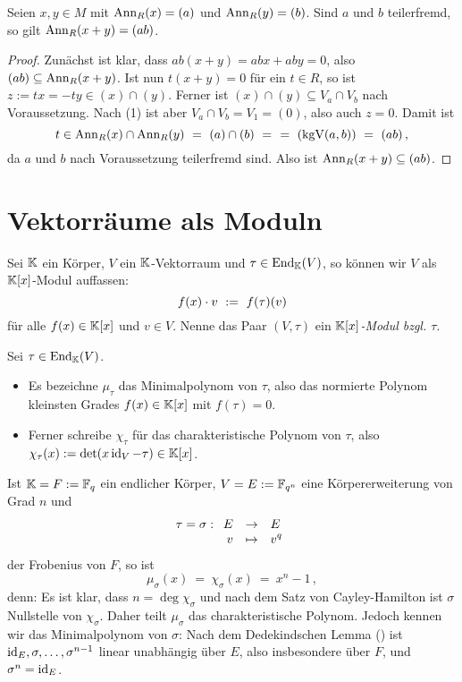 \begin{lemma}
  \label{lemma:annihilator_teilerfremd}
  Seien $x,y \in M$ mit $\operatorname{Ann}_R(x) = (a)$ und $\operatorname{Ann}_R(y) = (b)$. Sind 
  $a$ und $b$ teilerfremd, so gilt $\operatorname{Ann}_R(x+y) = (ab)$.
\end{lemma}
\begin{proof}
  Zunächst ist klar, dass $ab(x+y) = abx + aby = 0$, also 
  $(ab) \subseteq \operatorname{Ann}_R(x+y)$. Ist nun $t(x+y) = 0$ für ein $t \in R$, so
  ist $z:= tx = -ty \in (x)\cap(y)$. Ferner ist 
  $(x)\cap(y) \subseteq V_a \cap V_b$ nach Voraussetzung. 
  Nach  (1) ist aber 
  $V_a \cap V_b = V_1 =  (0)$,
  also auch $z=0$. Damit ist 
  \[ t \in \operatorname{Ann}_R(x)\cap \operatorname{Ann}_R(y) \ =\  (a)\cap(b) \ =\  
    \ =\  (\operatorname{kgV}(a,b)) \ =\  (ab)\,,\]
  da $a$ und $b$ nach Voraussetzung teilerfremd sind.
  Also ist $\operatorname{Ann}_R(x+y) \subseteq (ab)$.
\end{proof}


\section{Vektorräume als Moduln}

\begin{definition}[$(V,\tau)$]
  \label{def:V_tau}
  Sei $\mathbb{K}$ ein Körper, $V$ ein $\mathbb{K}$-Vektorraum und 
  $\tau \in \operatorname{End}_\mathbb{K}(V)$, so können wir $V$ als $\mathbb{K}[x]$-Modul auffassen:
  \[ f(x) \cdot v \ :=\  f(\tau)(v)\]
  für alle $f(x) \in \mathbb{K}[x]$ und $v\in V$.
  Nenne das Paar $(V,\tau)$ ein \emph{$\mathbb{K}[x]$-Modul bzgl. $\tau$}.
\end{definition}

\begin{notation}
  Sei $\tau\in \operatorname{End}_\mathbb{K}(V)$.
  \begin{itemize}
  \item Es bezeichne $\mu_\tau$ das Minimalpolynom von 
    $\tau$, also das normierte Polynom kleinsten Grades $f(x)\in \mathbb{K}[x]$ mit 
    $f(\tau) = 0$.
  \item Ferner schreibe $\chi_\tau$ für das charakteristische Polynom von 
    $\tau$, also $\chi_\tau(x) := \det(x \operatorname{id}_V - \tau) \in \mathbb{K}[x]$.
  \end{itemize}
\end{notation}


\begin{bemerkung}
  \label{bem:mipo_frob}
  Ist $\mathbb{K}  = F :=\mathbb{F}_q$ ein endlicher Körper, 
  $V = E := \mathbb{F}_{q^n}$ eine Körpererweiterung
  von Grad $n$ und 
  \[\tau = \sigma: \funcdef{E & \to & E\\
    v &\mapsto & v^q}\]
  der Frobenius von $F$, so ist
  \[ \mu_\sigma(x) \ =\ \chi_\sigma(x) \ =\ x^n - 1\,,\]
  denn: Es ist klar, dass $n = \deg \chi_\sigma$ und nach dem Satz von
  Cayley-Hamilton ist $\sigma$ Nullstelle von $\chi_\sigma$. Daher teilt
  $\mu_\sigma$ das charakteristische Polynom. Jedoch kennen wir das
  Minimalpolynom von $\sigma$: Nach dem Dedekindschen Lemma
  () ist 
  $\operatorname{id}_E,\sigma,\ldots,\sigma^{n-1}$ linear unabhängig über $E$, 
  also insbesondere über $F$, und $\sigma^n = \operatorname{id}_E$.
\end{bemerkung}


